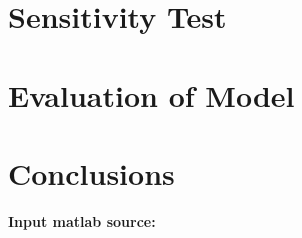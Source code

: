\documentclass{mcmthesis}
\numberwithin{figure}{section}
\numberwithin{table}{section}
\numberwithin{equation}{section}
\begin{document}
\section{Sensitivity Test}

\section{Evaluation of Model}

\section{Conclusions}

\newpage
{}
\memodate{\today}

\begin{memo}[report]
  
\end{memo}




\newpage







\newpage


\lhead{\small\sffamily \team}

\begin{appendices}




\textbf{\textcolor[rgb]{0.98,0.00,0.00}{Input matlab source:}}





\end{appendices}
\end{document}
